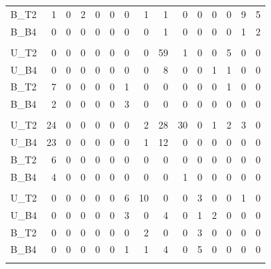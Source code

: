 \documentclass[
  11pt,
]{article}
\begin{document}
\begin{table}[!h]
{\begin{tabular}[t]{lrrrrrrrrrrrrrr}
\hspace{1em}B\_T2 & 1 & 0 & 2 & 0 & 0 & 0 & 1 & 1 & 0 & 0 & 0 & 0 & 9 & 5\\
\hspace{1em}B\_B4 & 0 & 0 & 0 & 0 & 0 & 0 & 0 & 1 & 0 & 0 & 0 & 0 & 1 & 2\\
\addlinespace[0.3em]
\multicolumn{15}{l}{\textit{\textbf{A. desertorum}}}\\
\hspace{1em}U\_T2 & 0 & 0 & 0 & 0 & 0 & 0 & 0 & 59 & 1 & 0 & 0 & 5 & 0 & 0\\
\hspace{1em}U\_B4 & 0 & 0 & 0 & 0 & 0 & 0 & 0 & 8 & 0 & 0 & 1 & 1 & 0 & 0\\
\hspace{1em}B\_T2 & 7 & 0 & 0 & 0 & 0 & 1 & 0 & 0 & 0 & 0 & 0 & 1 & 0 & 0\\
\hspace{1em}B\_B4 & 2 & 0 & 0 & 0 & 0 & 3 & 0 & 0 & 0 & 0 & 0 & 0 & 0 & 0\\
\addlinespace[0.3em]
\multicolumn{15}{l}{\textit{\textbf{C. testiculatum}}}\\
\hspace{1em}U\_T2 & 24 & 0 & 0 & 0 & 0 & 0 & 2 & 28 & 30 & 0 & 1 & 2 & 3 & 0\\
\hspace{1em}U\_B4 & 23 & 0 & 0 & 0 & 0 & 0 & 1 & 12 & 0 & 0 & 0 & 0 & 0 & 0\\
\hspace{1em}B\_T2 & 6 & 0 & 0 & 0 & 0 & 0 & 0 & 0 & 0 & 0 & 0 & 0 & 0 & 0\\
\hspace{1em}B\_B4 & 4 & 0 & 0 & 0 & 0 & 0 & 0 & 0 & 1 & 0 & 0 & 0 & 0 & 0\\
\addlinespace[0.3em]
\multicolumn{15}{l}{\textit{\textbf{C. parviflora}}}\\
\hspace{1em}U\_T2 & 0 & 0 & 0 & 0 & 0 & 6 & 10 & 0 & 0 & 3 & 0 & 0 & 1 & 0\\
\hspace{1em}U\_B4 & 0 & 0 & 0 & 0 & 0 & 3 & 0 & 4 & 0 & 1 & 2 & 0 & 0 & 0\\
\hspace{1em}B\_T2 & 0 & 0 & 0 & 0 & 0 & 0 & 2 & 0 & 0 & 3 & 0 & 0 & 0 & 0\\
\hspace{1em}B\_B4 & 0 & 0 & 0 & 0 & 0 & 1 & 1 & 4 & 0 & 5 & 0 & 0 & 0 & 0\\
\addlinespace[0.3em]
\multicolumn{15}{l}{\textit{\textbf{S. altissimum}}}\\

\end{tabular}}
\end{table}
\end{document}
